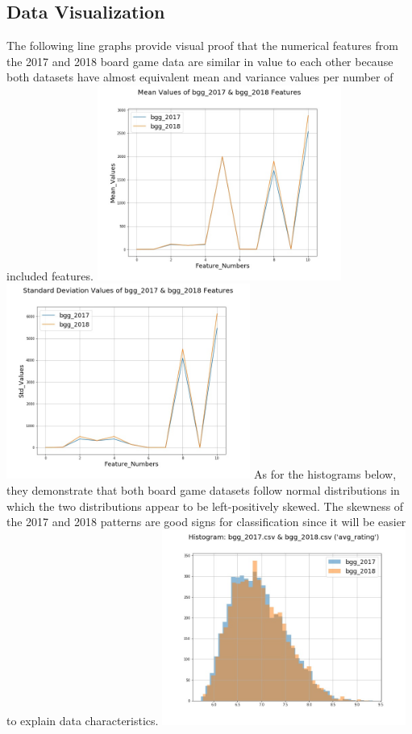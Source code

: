 \documentclass[a4paper,12pt]{IEEEtran}
\begin{document}
\subsection{Data Visualization}
\label{sec6}
The following line graphs provide visual proof that the numerical features from the 2017 and 2018 board game data are similar in value to each other because both datasets have almost equivalent mean and variance values per number of included features.
\includegraphics[width=8cm]{bgg_mean}
\includegraphics[width=8cm]{bgg_stddev}
As for the histograms below, they demonstrate that both board game datasets follow normal distributions in which the two distributions appear to be left-positively skewed. The skewness of the 2017 and 2018 patterns are good signs for classification since it will be easier to explain data characteristics.
\includegraphics[width=8cm]{bgg_hist01}
\end{document}
